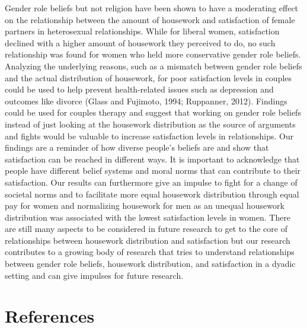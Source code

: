 \documentclass[
  man,floatsintext]{apa6}
\begin{document}
Gender role beliefs but not religion have been shown to have a moderating effect on the relationship between the amount of housework and satisfaction of female partners in heterosexual relationships. While for liberal women, satisfaction declined with a higher amount of housework they perceived to do, no such relationship was found for women who held more conservative gender role beliefs.\\
Analyzing the underlying reasons, such as a mismatch between gender role beliefs and the actual distribution of housework, for poor satisfaction levels in couples could be used to help prevent health-related issues such as depression and outcomes like divorce (Glass and Fujimoto, 1994; Ruppanner, 2012). Findings could be used for couples therapy and suggest that working on gender role beliefs instead of just looking at the housework distribution as the source of arguments and fights would be valuable to increase satisfaction levels in relationships.
Our findings are a reminder of how diverse people's beliefs are and show that satisfaction can be reached in different ways. It is important to acknowledge that people have different belief systems and moral norms that can contribute to their satisfaction.
Our results can furthermore give an impulse to fight for a change of societal norms and to facilitate more equal housework distribution through equal pay for women and normalizing housework for men as an unequal housework distribution was associated with the lowest satisfaction levels in women.
There are still many aspects to be considered in future research to get to the core of relationships between housework distribution and satisfaction but our research contributes to a growing body of research that tries to understand relationships between gender role beliefs, housework distribution, and satisfaction in a dyadic setting and can give impulses for future research.

\newpage

\hypertarget{references}{%
\section{References}\label{references}}
\end{document}
